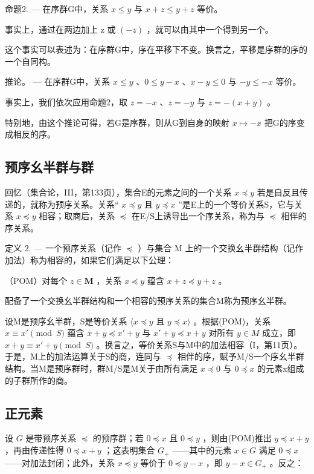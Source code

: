 命题2. --- 在序群G中，关系 \(x \leqslant y\) 与 \(x + z \leqslant y + z\) 等价。

事实上，通过在两边加上 z 或 \((-z)\) ，就可以由其中一个得到另一个。

这个事实可以表述为：在序群G中，序在平移下不变。换言之，平移是序群的序的一个自同构。

推论。 --- 在序群G中，关系 \(x \leqslant y\) 、\(0 \leqslant y - x\) 、\(x - y \leqslant 0\) 与 \(-y \leqslant -x\) 等价。

事实上，我们依次应用命题2，取 \(z = -x\) 、\(z = -y\) 与 \(z = - (x + y)\) 。

特别地，由这个推论可得，若G是序群，则从G到自身的映射 \(x \mapsto -x\) 把G的序变成相反的序。

\subsection{预序幺半群与群}

回忆（集合论，III，第133页），集合E的元素之间的一个关系 \(x \preccurlyeq y\) 若是自反且传递的，就称为预序关系。关系“ \(x \preccurlyeq y\) 且 \(y \preccurlyeq x\) ”是E上的一个等价关系S，它与关系 \(x \preccurlyeq y\) 相容；取商后，关系 \(\preccurlyeq\) 在E/S上诱导出一个序关系，称为与 \(\preccurlyeq\) 相伴的序关系。

定义 2. --- 一个预序关系（记作 \(\preccurlyeq\) ）与集合 M 上的一个交换幺半群结构（记作加法）称为相容的，如果它们满足以下公理：

（POM）对每个 \(z \in \mathbf{M}\) ，关系 \(x \preccurlyeq y\) 蕴含 \(x + z \preccurlyeq y + z\) 。

配备了一个交换幺半群结构和一个相容的预序关系的集合M称为预序幺半群。

设M是预序幺半群，S是等价关系 \(\langle x \preccurlyeq y\) 且 \(y \preccurlyeq x \rangle\) 。根据(POM)，关系 \(x \equiv x' \pmod{S}\) 蕴含 \(x + y \preccurlyeq x' + y\) 与 \(x' + y \preccurlyeq x + y\) 对所有 \(y \in M\) 成立，即 \(x + y \equiv x' + y \pmod{S}\) 。换言之，等价关系S与M中的加法相容（I，第11页）。于是，M上的加法运算关于S的商，连同与 \(\preccurlyeq\) 相伴的序，赋予M/S一个序幺半群结构。当M是预序群时，群M/S是M关于由所有满足 \(x \preccurlyeq 0\) 与 \(0 \preccurlyeq x\) 的元素x组成的子群所作的商。

\subsection{正元素}

设 \(G\) 是带预序关系 \(\preccurlyeq\) 的预序群；若 \(0 \preccurlyeq x\) 且 \(0 \preccurlyeq y\) ，则由(POM)推出 \(y \preccurlyeq x + y\) ，再由传递性得 \(0 \preccurlyeq x + y\) ；这表明集合 \(G_{+}\) ——其中的元素 \(x \in G\) 满足 \(0 \preccurlyeq x\) ——对加法封闭；此外，关系 \(x \preccurlyeq y\) 等价于 \(0 \preccurlyeq y - x\) ，即 \(y - x \in G_{+}\) 。反之：

